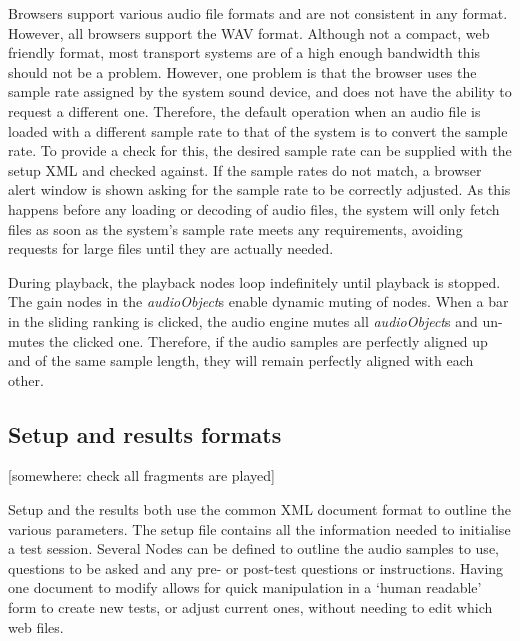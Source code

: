 \documentclass{article}
\begin{document}
Browsers support various audio file formats and are not consistent in any format. %
However, all browsers support the WAV format. Although not a compact, web friendly format, most transport systems are of a high enough bandwidth this should not be a problem. 
However, one problem is that the browser uses the sample rate assigned by the system sound device, %
and does not have the ability to request a different one. Therefore, the default operation when an audio file is loaded with a different sample rate to that of the system is to convert the sample rate. To provide a check for this, the desired sample rate can be supplied with the setup XML and checked against. If the sample rates do not match, a browser alert window is shown asking for the sample rate to be correctly adjusted. 
As this happens before any loading or decoding of audio files, the system will only fetch files as soon as the system's sample rate meets any requirements, avoiding requests for large files until they are actually needed. 

During playback, the playback nodes loop indefinitely until playback is stopped. The gain nodes in the \textit{audioObject}s enable dynamic muting of nodes. When a bar in the sliding ranking is clicked, the audio engine mutes all \textit{audioObject}s and un-mutes the clicked one. Therefore, if the audio samples are perfectly aligned up and of the same sample length, they will remain perfectly aligned with each other.


\subsection{Setup and results formats}\label{sec:setupresultsformats}

[somewhere: check all fragments are played]

Setup and the results both use the common XML document format to outline the various parameters. The setup file contains all the information needed to initialise a test session. Several Nodes %
 can be defined to outline the audio samples to use, questions to be asked and any pre- or post-test questions or instructions. Having one document to modify allows for quick manipulation in a `human readable' form to create new tests, or adjust current ones, without needing to edit which web files. %
\end{document}
